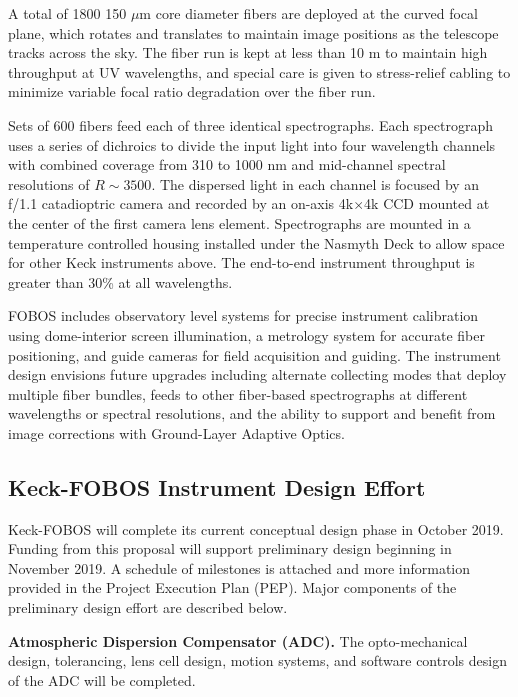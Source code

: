 \documentclass[oneside,11pt]{amsart}
\newcommand{\comment}[2][todo]{{\color{#1}[[{\bf #2}]]}}
\begin{document}
A total of 1800 150 $\mu$m core diameter fibers are deployed at the curved focal plane, which rotates and translates to
maintain image positions as the telescope tracks across the sky.  The fiber run is kept at less than 10 m to
maintain high throughput at UV wavelengths, and special care is given to stress-relief cabling to minimize variable
focal ratio degradation over the fiber run.

Sets of 600 fibers feed each of three identical spectrographs.  Each spectrograph uses a series of dichroics to divide
the input light into four wavelength channels with combined coverage from 310 to 1000 nm and mid-channel spectral
resolutions of $R \sim 3500$.  The dispersed light in each channel is focused by an f/1.1 catadioptric camera and
recorded by an on-axis 4k$\times$4k CCD mounted at the center of the first camera lens element.  Spectrographs are
mounted in a temperature controlled housing installed under the Nasmyth Deck to allow space for other Keck instruments
above.  The end-to-end instrument throughput is greater than 30\% at all wavelengths.

FOBOS includes observatory level systems for precise instrument calibration using dome-interior screen illumination, a
metrology system for accurate fiber positioning, and guide cameras for field acquisition and guiding.  The instrument
design envisions future upgrades including alternate collecting modes that deploy multiple fiber bundles, feeds to
other fiber-based spectrographs at different wavelengths or spectral resolutions, and the ability to support and
benefit from image corrections with Ground-Layer Adaptive Optics.



\subsection{Keck-FOBOS Instrument Design Effort}
\label{sec:design}

Keck-FOBOS will complete its current conceptual design phase in October 2019.  Funding from this proposal will support preliminary design beginning in November 2019.  A schedule of milestones is attached and more information provided in the Project Execution Plan (PEP).  Major components of the preliminary design effort are described below.

\noindent \textbf{Atmospheric Dispersion Compensator (ADC).} The opto-mechanical design, tolerancing, lens cell design, motion systems, and software controls design of the ADC will be completed.  
\end{document}
